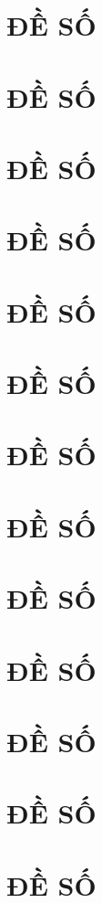 	\section{ĐỀ SỐ \thesection} 
	
	\section{ĐỀ SỐ \thesection} 
	
 	\section{ĐỀ SỐ \thesection} 
	
  	\section{ĐỀ SỐ \thesection} 
	
	\section{ĐỀ SỐ \thesection} 
	
	\section{ĐỀ SỐ \thesection} 
	
	\section{ĐỀ SỐ \thesection} 
	
	\section{ĐỀ SỐ \thesection} 
	
	\section{ĐỀ SỐ \thesection} 
	
 	\section{ĐỀ SỐ \thesection}
	
	\section{ĐỀ SỐ \thesection} 
	
	\section{ĐỀ SỐ \thesection} 
	
        \section{ĐỀ SỐ \thesection} 
	
